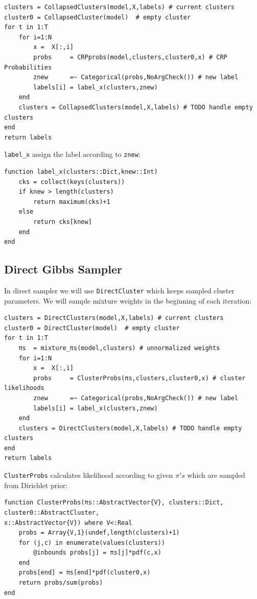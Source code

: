\documentclass[a4paper]{article}
\begin{document}
\begin{lstlisting}
clusters = CollapsedClusters(model,X,labels) # current clusters
cluster0 = CollapsedCluster(model)  # empty cluster
for t in 1:T
    for i=1:N
        x =  X[:,i]
        probs     = CRPprobs(model,clusters,cluster0,x) # CRP Probabilities
        znew      =~ Categorical(probs,NoArgCheck()) # new label
        labels[i] = label_x(clusters,znew)
    end
    clusters = CollapsedClusters(model,X,labels) # TODO handle empty clusters
end
return labels
\end{lstlisting}

\texttt{label\_x} assign the label according to \texttt{znew}:
\begin{lstlisting}[linewidth=11cm]
function label_x(clusters::Dict,knew::Int)
    cks = collect(keys(clusters))
    if knew > length(clusters)
        return maximum(cks)+1
    else
        return cks[knew]
    end
end
\end{lstlisting}

\subsection{Direct Gibbs Sampler}
In direct sampler we will use \texttt{DirectCluster} which keeps sampled cluster parameters. We will sample mixture weights in the beginning of each iteration:

\begin{lstlisting}
clusters = DirectClusters(model,X,labels) # current clusters
cluster0 = DirectCluster(model)  # empty cluster
for t in 1:T
    πs  = mixture_πs(model,clusters) # unnormalized weights
    for i=1:N
        x =  X[:,i]
        probs     = ClusterProbs(πs,clusters,cluster0,x) # cluster likelihoods
        znew      =~ Categorical(probs,NoArgCheck()) # new label
        labels[i] = label_x(clusters,znew)
    end
    clusters = DirectClusters(model,X,labels) # TODO handle empty clusters
end
return labels
\end{lstlisting}

\texttt{ClusterProbs} calculates likelihood according to given $\pi's$ which are sampled from Dirichlet prior:

\begin{lstlisting}[linewidth=17cm]
function ClusterProbs(πs::AbstractVector{V}, clusters::Dict, cluster0::AbstractCluster,
x::AbstractVector{V}) where V<:Real
    probs = Array{V,1}(undef,length(clusters)+1)
    for (j,c) in enumerate(values(clusters))
        @inbounds probs[j] = πs[j]*pdf(c,x)
    end
    probs[end] = πs[end]*pdf(cluster0,x)
    return probs/sum(probs)
end
\end{lstlisting}
\end{document}
